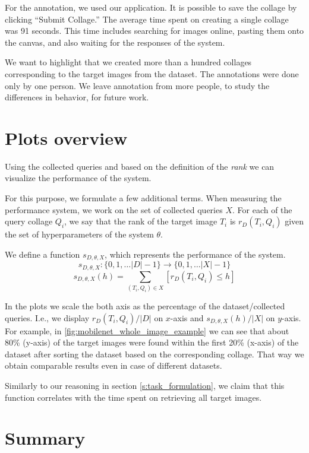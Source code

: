 For the annotation, we used our application. It is possible to save the collage by clicking ``Submit Collage.'' The average time spent on creating a single collage was 91 seconds. This time includes searching for images online, pasting them onto the canvas, and also waiting for the responses of the system.

We want to highlight that we created more than a hundred collages corresponding to the target images from the dataset. The annotations were done only by one person. We leave annotation from more people, to study the differences in behavior, for future work. 

\section{Plots overview}

Using the collected queries and based on the definition of the \emph{rank} we can visualize the performance of the system.

For this purpose, we formulate a few additional terms. When measuring the performance system, we work on the set of collected queries $X$. For each of the query collage $Q_i$, we say that the rank of the target image $T_i$ is $r_D(T_i, Q_i)$ given the set of hyperparameters of the system $\theta$.

We define a function $s_{D, \theta, X}$, which represents the performance of the system.
$$
s_{D, \theta, X}:\{0, 1, \ldots |D| - 1\} \rightarrow \{0, 1, \ldots |X| - 1\}
$$  
$$
s_{D, \theta, X}(h) = \sum_{(T_i, Q_i) \in X}[r_D(T_i, Q_i) \leq h]
$$

In the plots we scale the both axis as the percentage of the dataset/collected queries. I.e., we display $r_D(T_i, Q_i) / |D|$ on $x$-axis and $s_{D, \theta, X}(h) / |X|$ on $y$-axis. For example, in \autoref{fig:mobilenet_whole_image_example} we can see that about 80\% (y-axis) of the target images were found within the first 20\% (x-axis) of the dataset after sorting the dataset based on the corresponding collage.
That way we obtain comparable results even in case of different datasets. 

Similarly to our reasoning in section \ref{s:task_formulation}, we claim that this function correlates with the time spent on retrieving all target images.

\section{Summary}


